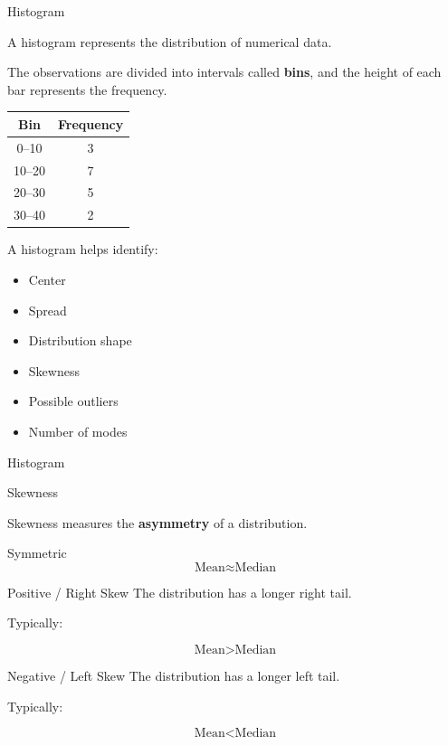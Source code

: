 \documentclass[aspectratio=169]{beamer}
\begin{document}
\begin{frame}{Histogram}

A histogram represents the distribution of numerical data.

The observations are divided into intervals called \textbf{bins},
and the height of each bar represents the frequency.

\begin{center}
\begin{tabular}{c|c}
\textbf{Bin} & \textbf{Frequency}\\
\hline
0--10 & 3\\
10--20 & 7\\
20--30 & 5\\
30--40 & 2
\end{tabular}
\end{center}

A histogram helps identify:

\begin{itemize}
    \item Center
    \item Spread
    \item Distribution shape
    \item Skewness
    \item Possible outliers
    \item Number of modes
\end{itemize}
\end{frame}
\begin{frame}{Histogram}
\centering
{}
\end{frame}
\begin{frame}{Skewness}

Skewness measures the \textbf{asymmetry} of a distribution.

\begin{block}{Symmetric}
\[
\text{Mean}\approx\text{Median}
\]
\end{block}

\begin{block}{Positive / Right Skew}
The distribution has a longer right tail.

Typically:

\[
\text{Mean}>\text{Median}
\]
\end{block}

\begin{block}{Negative / Left Skew}
The distribution has a longer left tail.

Typically:

\[
\text{Mean}<\text{Median}
\]
\end{block}
\end{frame}
\end{document}
